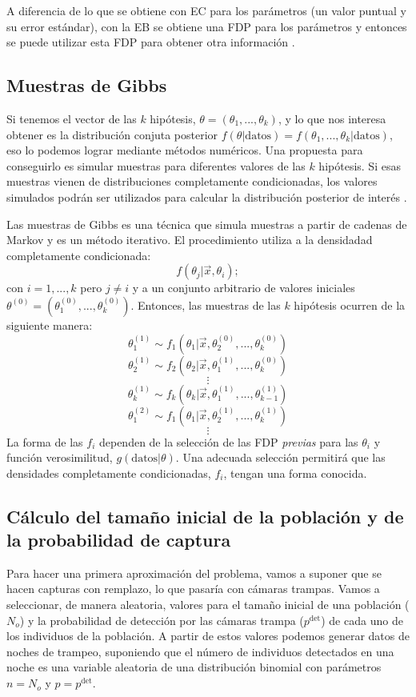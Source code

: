 \documentclass{article}
\begin{document}
A diferencia de lo que se obtiene con EC para los par\'ametros (un valor puntual
y su error est\'andar), con la EB se obtiene una FDP para los
par\'ametros y entonces se puede utilizar esta FDP para obtener otra
informaci\'on \citep{Lynch2007}.

\subsection*{Muestras de Gibbs}
Si tenemos el vector de las $k$ hip\'otesis, $\theta=(\theta_1,...,\theta_k)$, y
lo que nos interesa obtener es la distribuci\'on conjuta posterior
$f(\theta |\mbox{datos})=f(\theta_1,...,\theta_k|\mbox{datos})$, eso lo podemos
lograr mediante m\'etodos num\'ericos. Una propuesta
para conseguirlo es simular muestras para diferentes valores de las $k$
hip\'otesis. Si esas muestras vienen de distribuciones completamente
condicionadas, los valores simulados podr\'an ser utilizados para calcular la
distribuci\'on posterior de inter\'es \citep{Bernardo2000}.

Las muestras de Gibbs es una t\'ecnica que simula muestras a partir de cadenas
de Markov y es un m\'etodo iterativo. El procedimiento utiliza a la densidadad
completamente condicionada:
$$
f(\theta_j|\vec x,\theta_i);
$$
con $i=1,...,k$ pero $j\neq i$ y a un conjunto arbitrario de valores iniciales
$\theta^{(0)}=(\theta^{(0)}_1,...,\theta^{(0)}_k)$. Entonces, las muestras de
las $k$ hip\'otesis ocurren de la siguiente manera:
$$\theta^{(1)}_{1}\sim f_1(\theta_1|\vec x,\theta^{(0)}_2,...,\theta^{(0)}_k)$$
$$\theta^{(1)}_{2}\sim f_2(\theta_2|\vec x,\theta^{(1)}_1,...,\theta^{(0)}_k)$$
$$\vdots$$
$$\theta^{(1)}_{k}\sim f_k(\theta_k|\vec x,\theta^{(1)}_1,...,\theta^{(1)}_{k-1})$$
$$\theta^{(2)}_{1}\sim f_1(\theta_1|\vec x,\theta^{(1)}_2,...,\theta^{(1)}_k)$$
$$\vdots$$
La forma de las $f_i$ dependen de la selecci\'on de las FDP {\it previas} para
las $\theta_i$ y funci\'on verosimilitud, $g(\mbox{datos} |\theta)$. Una
adecuada selecci\'on permitir\'a que las densidades completamente condicionadas,
$f_i$, tengan una forma conocida.

\subsection*{C\'alculo del tama\~no inicial de la poblaci\'on y de la
probabilidad de captura}
Para hacer una primera aproximaci\'on del problema, vamos a suponer que se hacen
capturas con remplazo, lo que pasar\'ia con c\'amaras trampas. Vamos a
seleccionar, de manera aleatoria, valores para el tama\~no inicial de una
poblaci\'on ($N_o$) y la probabilidad de detecci\'on por las c\'amaras trampa
($p^{\mbox{det}}$) de cada uno de los individuos de la poblaci\'on.  A
partir de estos valores podemos generar datos de noches de trampeo, suponiendo
que el n\'umero de individuos detectados en una noche es una variable
aleatoria de una distribuci\'on binomial con par\'ametros $n=N_o$ y
$p=p^{\mbox{det}}$.
\end{document}

